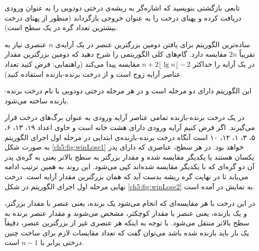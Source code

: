  تابعی بازگشتی بنویسید که اشاره‌گر به ریشه‌ی درختی دودویی را به عنوان ورودی دریافت کرده و پهنای درخت را به عنوان خروجی بازگرداند (منظور از پهنای درخت بیشترین تعداد گره در یک سطح است).


 ساده‌ترین الگوریتم برای یافتن دومین بزرگترین عنصر در یک آرایه‌ی {$n$} عنصری نیاز به تقریباً {$2n$} مقایسه دارد. گام‌های کلی الگوریتمی را شرح دهید که دومین بزرگترین مقدار در یک آرایه را حداکثر {$n+2\lfloor \lg n \rfloor - 2$} مقایسه پیدا می‌کند (راهنمایی: فرض کنید تعداد عناصر آرایه زوج است و از درخت‌ برنده-بازنده استفاده کنید).


این الگوریتم دارای دو مرحله است و در هر مرحله درختی دودویی با نام درخت برنده-بازنده ساخته می‌شود.

در یک درخت برنده-بازنده تمامی عناصر آرایه ورودی به عنوان برگ‌های درخت قرار می‌گیرند. اگر فرض کنیم آرایه ورودی دارای هشت خانه است و حاوی اعداد ۱۹، ۱۳، ۶، ۵، ۳، ۱، ۱۲، ۱۰ است آنگاه درخت برنده-بازنده‌ی ابتدایی در مرحله اول اجرای الگوریتم به صورت شکل {\eqref{ch5:fig:winLose1}} خواهد بود. در هر سطح، عناصری که دارای پدر یکسان هستند با یکدیگر مقایسه شده و مقدار بزرگتر به سطح بالاتر یعنی به گره‌ی پدر آن دو گره‌ای که با یکدیگر مقایسه شده‌اند کپی می‌شود. این روند به همین ترتیب ادامه می‌یابد تا در نهایت گره ریشه بدست آید که همان بزرگترین مقدار آرایه است. درخت نهایی مرحله اول اجرای الگوریتم در شکل {\eqref{ch5:fig:winLose2}} به نمایش در آمده است. 

در این درخت با هر مقایسه‌ای که انجام می‌شود یک برنده، یعنی عنصر با مقدار بزرگتر، و یک بازنده، یعنی عنصر با مقدار کوچکتر، مشخص می‌شوند و مقدار عنصر برنده به سطح بالاتر منتقل می‌شود. با توجه به اینکه هر عنصری غیر از بزرگترین عنصر، دقیقاً یک بار باید بازنده شده‌ باشد می‌توان گفت که تعداد مقایسات لازم برای ساخت چنین درختی برابر با {$n-1$} است. 

